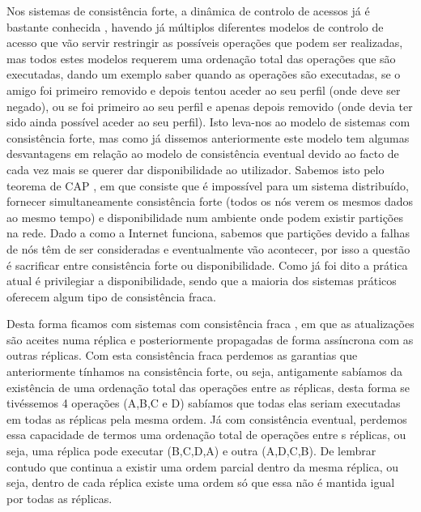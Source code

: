 \documentclass[runningheads,a4paper]{llncs}
\begin{document}
Nos sistemas de consistência forte, a dinâmica de controlo de acessos já é bastante conhecida \cite{sandhu1998role} \cite{hu2015attribute} \cite{hu2013guide} \cite{ferraiolo2003role} \cite{jin2012rabac} \cite{samarati2001access}, havendo já múltiplos diferentes modelos de controlo de acesso que vão servir restringir as possíveis operações que podem ser realizadas, mas todos estes modelos requerem uma ordenação total das operações que são executadas, dando um exemplo saber quando as operações são executadas, se o amigo foi primeiro removido e depois tentou aceder ao seu perfil (onde deve ser negado), ou se foi primeiro ao seu perfil e apenas depois removido (onde devia ter sido ainda possível aceder ao seu perfil). Isto leva-nos ao modelo de sistemas com consistência forte, mas como já dissemos anteriormente este modelo tem algumas desvantagens em relação ao modelo de consistência eventual devido ao facto de cada vez mais se querer dar disponibilidade ao utilizador. Sabemos isto pelo teorema de CAP \cite{simonbrewer}, em que consiste que é impossível para um sistema distribuído, fornecer simultaneamente consistência forte (todos os nós verem os mesmos dados ao mesmo tempo) e disponibilidade num ambiente onde podem existir partições na rede. Dado a como a Internet funciona, sabemos que partições devido a falhas de nós têm de ser consideradas e eventualmente vão acontecer, por isso a questão é sacrificar entre consistência forte ou disponibilidade. Como já foi dito a prática atual é privilegiar a disponibilidade, sendo que a maioria dos sistemas práticos oferecem algum tipo de consistência fraca.

Desta forma ficamos com sistemas com consistência fraca \cite{vogels2009eventually}, em que as atualizações são aceites numa réplica e posteriormente propagadas de forma assíncrona com as outras réplicas. Com esta consistência fraca perdemos as garantias que anteriormente tínhamos na consistência forte, ou seja, antigamente sabíamos da existência  de uma ordenação total das operações entre as réplicas, desta forma se tivéssemos 4 operações (A,B,C e D) sabíamos que todas elas seriam executadas em todas as réplicas pela mesma ordem. Já com consistência eventual, perdemos essa capacidade de termos uma ordenação total de operações entre s réplicas, ou seja, uma réplica pode executar (B,C,D,A) e outra (A,D,C,B). De lembrar contudo que continua a existir uma ordem parcial dentro da mesma réplica, ou seja, dentro de cada réplica existe uma ordem só que essa não é mantida igual por todas as réplicas.
\end{document}
